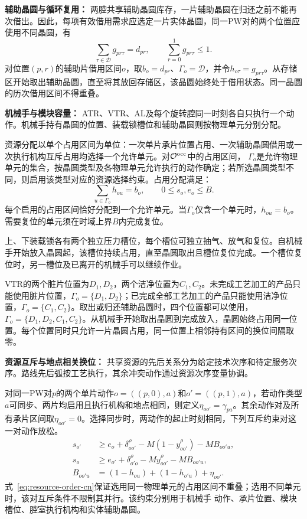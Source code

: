 \documentclass[preprint,12pt,nonatbib]{elsarticle}
\begin{document}
\noindent\textbf{辅助晶圆与循环复用：}
两腔共享辅助晶圆库存，一片辅助晶圆在归还之前不能再次借出。因此，每项有效借用需求应选定一片实体晶圆，同一PW对的两个位置应使用不同晶圆，有
\begin{equation}
\sum_{\tau\in\mathcal D}g_{pr\tau}=d_{pr},\qquad
\sum_{r=0}^{1}g_{pr\tau}\le1.
\label{eq:dummy-assign-cn}
\end{equation}
对位置$(p,r)$的辅助片借用区间$o$，取$b_o=d_{pr}$、$\Gamma_o=\mathcal D$，并令$h_{o\tau}=g_{pr\tau}$。从存储区开始取出辅助晶圆，直至将其放回存储区，该晶圆始终处于借用状态。同一晶圆的历次借用区间不得重叠。

\noindent\textbf{机械手与模块容量：}
ATR、VTR、AL及每个旋转腔同一时刻各自只执行一个动作。机械手持有晶圆的位置、装载锁槽位和辅助晶圆则按物理单元分别分配。

资源分配以单个占用区间为单位：一次单片承片位置占用、一次辅助晶圆借用或一次执行机构互斥占用均选择一个允许单元。对$\mathcal O^{\rm occ}$中的占用区间，
$\Gamma_o$是允许物理单元的集合，按晶圆类型及各物理单元允许执行的动作确定；若所选晶圆类型不同，则启用该类型对应的资源选择约束。占用分配满足：
\begin{equation}
\sum_{u\in\Gamma_o}h_{ou}=b_o,\qquad 0\le s_o,e_o\le B.
\label{eq:slot-select-cn}
\end{equation}
每个启用的占用区间恰好分配到一个允许单元。当$\Gamma_o$仅含一个单元时，$h_{ou}=b_o$。需要复位的单元须在时域上界$B$内完成复位。

上、下装载锁各有两个独立压力槽位，每个槽位可独立抽气、放气和复位。自机械手开始放入晶圆起，该槽位持续占用，直至晶圆取出且槽位复位完成。一个槽位复位时，另一槽位及已离开的机械手可以继续作业。

VTR的两个脏片位置为$D_1,D_2$，两个洁净位置为$C_1,C_2$。未完成工艺加工的产品只能使用脏片位置，$\Gamma_o=\{D_1,D_2\}$；已完成全部工艺加工的产品只能使用洁净位置，$\Gamma_o=\{C_1,C_2\}$。取出或归还辅助晶圆时，四个位置都可以使用，$\Gamma_o=\{D_1,D_2,C_1,C_2\}$。从机械手开始取出晶圆到完成放入，晶圆始终占用同一位置。每个位置同时只允许一片晶圆占用，同一位置上相邻持有区间的换位间隔取零。

\noindent\textbf{资源互斥与地点相关换位：}
共享资源的先后关系分为给定技术次序和待定服务次序。路线先后弧按工艺执行，其余冲突动作通过资源次序变量协调。

对同一PW对$p$的两个单片动作$o=((p,0),a)$和$o'=((p,1),a)$，若动作类型$a$可同步、两片均启用且执行机构和地点相同，则定义$\eta_{oo'}=\gamma_{pa}$。其余动作对及所有承片区间取$\eta_{oo'}=0$。选择同步时，两动作的起止时刻相同，下列互斥约束对这一对动作放松。
\begin{equation}
\begin{aligned}
s_{o'}&\ge e_o+\delta^\rho_{oo'}-M(1-y^\rho_{oo'})-M B_{oo'u},\\
s_o&\ge e_{o'}+\delta^\rho_{o'o}-My^\rho_{oo'}-M B_{oo'u},\\
B_{oo'u}&=(1-h_{ou})+(1-h_{o'u})+\eta_{oo'}.
\end{aligned}
\label{eq:resource-order-cn}
\end{equation}
式~\eqref{eq:resource-order-cn}保证选用同一物理单元的占用区间不重叠；选用不同单元时，该对互斥条件不限制其并行。该约束分别用于机械手
动作、承片位置、模块槽位、腔室执行机构和实体辅助晶圆。
\end{document}

